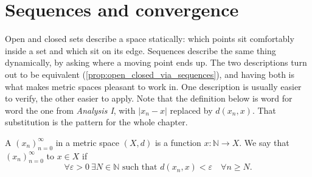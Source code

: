 
\section{Sequences and convergence}
\label{sec:sequences_and_convergence}

Open and closed sets describe a space statically: which points sit comfortably inside a set and
which sit on its edge. Sequences describe the same thing dynamically, by asking where a moving
point ends up. The two descriptions turn out to be equivalent
(\cref{prop:open_closed_via_sequences}), and having both is what makes metric spaces pleasant to
work in. One description is usually easier to verify, the other easier to apply. Note that the
definition below is word for word the one from \emph{Analysis I}, with $|x_n - x|$ replaced by
$d(x_n,x)$. That substitution is the pattern for the whole chapter.

\begin{definition}
\label{def:convergent_sequence}
A  $(x_n)_{n=0}^{\infty}$ in a metric space $(X,d)$ is a function
$x : \mathbb{N} \to X$. We say that $(x_n)_{n=0}^{\infty}$  to $x \in X$ if
\[\forall \varepsilon > 0 \ \exists N \in \mathbb{N} \text{ such that } d(x_n, x) < \varepsilon \quad \forall n \geq N.\]
\end{definition}

\begin{center}
\end{center}

